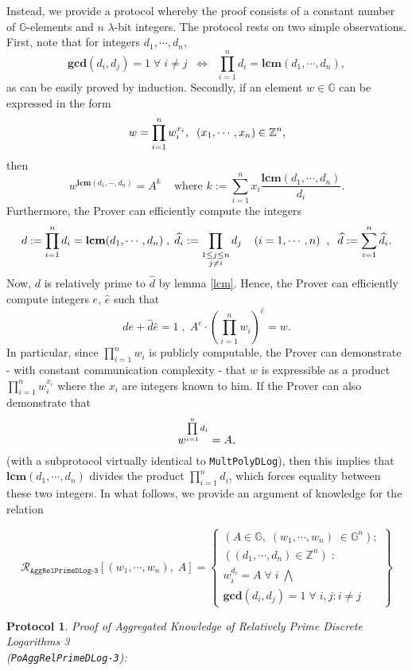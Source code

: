 \documentclass[11pt, lettersize, notitlepage, leqno, footskip=0.6cm]{article}
\newcommand{\bz}{\mathbb Z}
\newcommand{\pl}{\prod\limits}
\newcommand{\slim}{\sum\limits}
\newcommand{\ttt}{\texttt}
\newcommand{\LRA}{\Longleftrightarrow}
\newcommand{\mc}{\mathcal}
\newcommand{\mb}{\mathbb}
\newcommand{\mbf}{\mathbf}
\newcommand{\lam}{\lambda}
\newcommand{\what}{\widehat}
\newcommand{\vs}{\vspace{-0.15cm}}
\newcommand{\LCM}{\mbf{lcm}}
\newcommand{\GCD}{\mbf{gcd}}
\newtheorem{Prot}[Thm]{Protocol}
\numberwithin{equation}{section}
\begin{document}
Instead, we provide a protocol whereby the proof consists of a constant number of $\mb{G}$-elements and $n$ $\lam$-bit integers. The protocol rests on two simple observations. First, note that for integers $d_1,\cdots,d_n$, \vs $$\GCD(d_i,d_j)=1\;\forall\;i\neq j\;\; \LRA\;\; \pl_{i=1}^n d_i= \LCM(d_1,\cdots,d_n),$$ as can be easily proved by induction. Secondly, if an element $w\in \mb{G}$ can be expressed in the form \vs $$w = \prod\limits_{i=1}^n w_i^{x_i},\;\;(x_1,\cdots,x_n)\in\bz^n, \vs$$ then \vs $$w^{\LCM(d_1,\cdots,d_n)} = A^{k} \;\;\;\text{ where } k := \slim_{i=1}^n x_i\frac{\LCM(d_1,\cdots,d_n)}{d_i}.$$ Furthermore, the Prover can efficiently compute the integers \vs $$d:= \pl_{i=1}^n d_i = \LCM(d_1,\cdots,d_n)\;,\;\what{d}_i:= \pl_{\substack{1\leq j\leq n\\ j\neq i}} d_j\;\;\;\; (i=1,\cdots,n)\;\;,\;\; \what{d} := \slim_{i=1}^n \what{d}_i. \vs $$ Now, $d$ is relatively prime to $\what{d}$ by lemma \ref{lcm}. Hence, the Prover can efficiently compute integers $e$, $\what{e}$ such that \vs $$de+\what{d}\what{e} = 1\;,\; A^e \cdot (\pl_{i=1}^n w_i)^{\what{e}} = w.  $$ In particular, since $\prod_{i=1}^n w_i$ is publicly computable, the Prover can demonstrate - with constant communication complexity - that $w$ is expressible as a product $\prod_{i=1}^n w_i^{x_i}$ where the $x_i$ are integers known to him. If the Prover can also demonstrate that \vs $$w^{\prod\limits_{i=1}^n d_i} = A, \vs$$ (with a subprotocol virtually identical to \verb|MultPolyDLog|), then this implies that $\LCM(d_1,\cdots,d_n)$ divides the product $\prod_{i=1}^n d_i$, which forces equality between these two integers. In what follows, we provide an argument of knowledge for the relation  

\[
  \mc{R}_{\ttt{AggRelPrimeDLog-3}}[(w_1,\cdots, w_n),\; A] = \left\{\begin{array}{l}
    (A\in\mb{G},\; (w_1,\cdots, w_n)\;\in\mb{G}^n);\\
    ((d_1,\cdots,d_n)\in\bz^n)\;: \\
    w_i^{d_i} = A\;\forall\; i\;\bigwedge\\
   	\GCD(d_i, d_j) = 1\;\forall \;i,j: i\neq j
  \end{array}\right\}
\] 

\vspace{0.1cm}



\begin{Prot} \normalfont \hypertarget{RP3}{\textit{Proof of Aggregated Knowledge of Relatively Prime Discrete Logarithms} 3}\\ (\verb|PoAggRelPrimeDLog-3|):\end{Prot} \vspace{-0.3cm}
\end{document}
